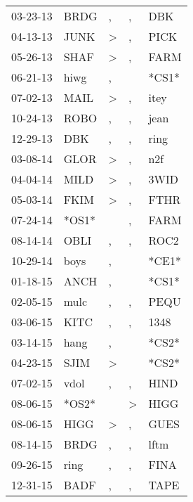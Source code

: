 \begin{supertabular}{lllll}
 03-23-13 &   BRDG &                , &                , &    DBK \\
 04-13-13 &   JUNK &     \textgreater &                , &   PICK \\
 05-26-13 &   SHAF &     \textgreater &                , &   FARM \\
 06-21-13 &   hiwg &                , &                  &  *CS1* \\
 07-02-13 &   MAIL &     \textgreater &                , &   itey \\
 10-24-13 &   ROBO &                , &                , &   jean \\
 12-29-13 &    DBK &                , &                , &   ring \\
 03-08-14 &   GLOR &     \textgreater &                , &    n2f \\
 04-04-14 &   MILD &     \textgreater &                , &   3WID \\
 05-03-14 &   FKIM &     \textgreater &                , &   FTHR \\
 07-24-14 &  *OS1* &                  &                , &   FARM \\
 08-14-14 &   OBLI &                , &                , &   ROC2 \\
 10-29-14 &   boys &                , &                  &  *CE1* \\
 01-18-15 &   ANCH &                , &                  &  *CS1* \\
 02-05-15 &   mulc &                , &                , &   PEQU \\
 03-06-15 &   KITC &                , &                , &   1348 \\
 03-14-15 &   hang &                , &                  &  *CS2* \\
 04-23-15 &   SJIM &     \textgreater &                  &  *CS2* \\
 07-02-15 &   vdol &                , &                , &   HIND \\
 08-06-15 &  *OS2* &                  &     \textgreater &   HIGG \\
 08-06-15 &   HIGG &     \textgreater &                , &   GUES \\
 08-14-15 &   BRDG &                , &                , &   lftm \\
 09-26-15 &   ring &                , &                , &   FINA \\
 12-31-15 &   BADF &                , &                , &   TAPE \\

\end{supertabular}
